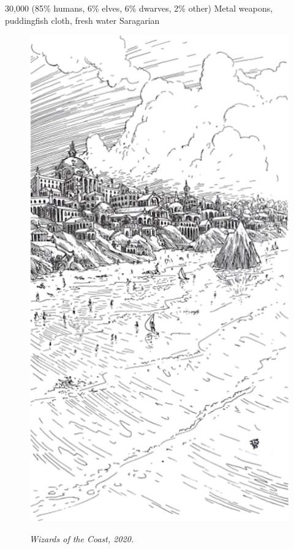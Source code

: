 {30,000 (85\% humans, 6\% elves, 6\% dwarves, 2\% other)}
{Metal weapons, puddingfish cloth, fresh water}
{Saragarian}
{
\begin{figure}[b!]
\centering
\includegraphics[width=\columnwidth]{images/saragar-2.png}
\par\textit{\small\textcopyright Wizards of the Coast, 2020.}
\end{figure}

}
